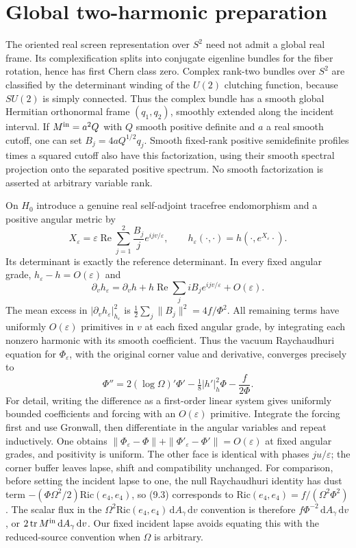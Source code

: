 \documentclass[11pt]{article}
\newcommand{\eps}{\varepsilon}
\newcommand{\Tr}{\operatorname{tr}}
\newcommand{\dd}{\mathrm d}
\begin{document}
\section{Global two-harmonic preparation}
The oriented real screen representation over $S^2$ need not admit a global real frame. Its complexification splits into conjugate eigenline bundles for the fiber rotation, hence has first Chern class zero. Complex rank-two bundles over $S^2$ are classified by the determinant winding of the $U(2)$ clutching function, because $SU(2)$ is simply connected. Thus the complex bundle has a smooth global Hermitian orthonormal frame $(q_1,q_2)$, smoothly extended along the incident interval. If $M^{\rm in}=a^2Q$ with $Q$ smooth positive definite and $a$ a real smooth cutoff, one can set $B_j=4aQ^{1/2}q_j$. Smooth fixed-rank positive semidefinite profiles times a squared cutoff also have this factorization, using their smooth spectral projection onto the separated positive spectrum. No smooth factorization is asserted at arbitrary variable rank.

On $H_0$ introduce a genuine real self-adjoint tracefree endomorphism and a positive angular metric by
\[
 X_\eps=\eps\operatorname{Re}\sum_{j=1}^2\frac{B_j}{j}e^{ijv/\eps},
 \qquad h_\eps(\cdot,\cdot)=h(\cdot,e^{X_\eps}\cdot).
\]
Its determinant is exactly the reference determinant. In every fixed angular grade, $h_\eps-h=O(\eps)$ and
\[
 \partial_v h_\eps=\partial_v h+
      h\operatorname{Re}\sum_j iB_j e^{ijv/\eps}+O(\eps).
\]
The mean excess in $|\partial_vh_\eps|_{h_\eps}^2$ is $\tfrac12\sum_j\|B_j\|^2=4f/\Phi^2$. All remaining terms have uniformly $O(\eps)$ primitives in $v$ at each fixed angular grade, by integrating each nonzero harmonic with its smooth coefficient. Thus the vacuum Raychaudhuri equation for $\Phi_\eps$, with the original corner value and derivative, converges precisely to
\[
 \Phi''=2(\log\Omega)'\Phi'-\tfrac18 |h'|_h^2\Phi-\frac{f}{2\Phi}.
\]
For detail, writing the difference as a first-order linear system gives uniformly bounded coefficients and forcing with an $O(\eps)$ primitive. Integrate the forcing first and use Gronwall, then differentiate in the angular variables and repeat inductively. One obtains $\|\Phi_\eps-\Phi\|+\|\Phi'_\eps-\Phi'\|=O(\eps)$ at fixed angular grades, and positivity is uniform. The other face is identical with phases $ju/\eps$; the corner buffer leaves lapse, shift and compatibility unchanged. For comparison, before setting the incident lapse to one, the null Raychaudhuri identity has dust term $-(\Phi\Omega^2/2)\mathrm{Ric}(e_4,e_4)$, so (9.3) corresponds to $\mathrm{Ric}(e_4,e_4)=f/(\Omega^2\Phi^2)$. The scalar flux in the $\Omega^2\mathrm{Ric}(e_4,e_4)\,\dd A_\gamma\,\dd v$ convention is therefore $f\Phi^{-2}\,\dd A_\gamma\,\dd v$, or $2\Tr M^{\rm in}\,\dd A_\gamma\,\dd v$. Our fixed incident lapse avoids equating this with the reduced-source convention when $\Omega$ is arbitrary.
\end{document}
